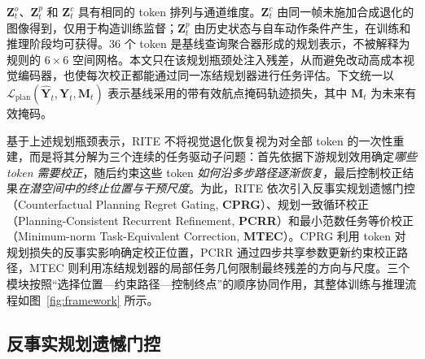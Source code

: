 \documentclass[letterpaper,10pt,conference]{ieeeconf}
\begin{document}
$\mathbf Z_t^o$、$\mathbf Z_t^p$ 和 $\mathbf Z_t^c$ 具有相同的 token 排列与通道维度。$\mathbf Z_t^c$ 由同一帧未施加合成退化的图像得到，仅用于构造训练监督；$\mathbf Z_t^p$ 由历史状态与自车动作条件产生，在训练和推理阶段均可获得。36 个 token 是基线查询聚合器形成的规划表示，不被解释为规则的 $6\times6$ 空间网格。本文只在该规划瓶颈处注入残差，从而避免改动高成本视觉编码器，也使每次校正都能通过同一冻结规划器进行任务评估。下文统一以 $\mathcal L_{\mathrm{plan}}(\hat{\mathbf Y}_t,\mathbf Y_t,\mathbf M_t)$ 表示基线采用的带有效航点掩码轨迹损失，其中 $\mathbf M_t$ 为未来有效掩码。

基于上述规划瓶颈表示，RITE 不将视觉退化恢复视为对全部 token 的一次性重建，而是将其分解为三个连续的任务驱动子问题：首先依据下游规划效用确定\emph{哪些 token 需要校正}，随后约束这些 token \emph{如何沿多步路径逐渐恢复}，最后控制校正结果\emph{在潜空间中的终止位置与干预尺度}。为此，RITE 依次引入反事实规划遗憾门控（Counterfactual Planning Regret Gating, \textbf{CPRG}）、规划一致循环校正（Planning-Consistent Recurrent Refinement, \textbf{PCRR}）和最小范数任务等价校正（Minimum-norm Task-Equivalent Correction, \textbf{MTEC}）。CPRG 利用 token 对规划损失的反事实影响确定校正位置，PCRR 通过四步共享参数更新约束校正路径，MTEC 则利用冻结规划器的局部任务几何限制最终残差的方向与尺度。三个模块按照“选择位置—约束路径—控制终点”的顺序协同作用，其整体训练与推理流程如图~\ref{fig:framework} 所示。

\subsection{反事实规划遗憾门控}
\end{document}
